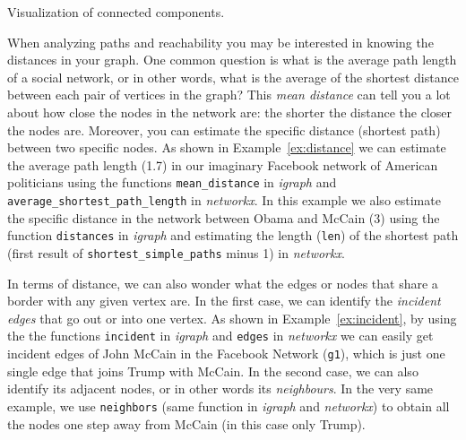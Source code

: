 \begin{ccsexample}
  \caption{Visualization of connected components.}
  \label{ex:component}
\end{ccsexample}

When analyzing paths and reachability you may be interested in knowing the distances in your graph. One common question is what is the average path length of a social network, or in other words, what is the average of the shortest distance between each pair of vertices in the graph? This \emph{mean distance} can tell you a lot about how close the nodes in the network are: the shorter the distance the closer the nodes are. Moreover, you can estimate the specific distance (shortest path) between two specific nodes.  As shown in Example~\ref{ex:distance} we can estimate the average path length (1.7) in our imaginary Facebook network of American politicians using the functions \texttt{mean\_distance} in \emph{igraph} and \texttt{average\_shortest\_path\_length} in \emph{networkx}. In this example we also estimate the specific distance in the network between Obama and McCain (3) using the function \texttt{distances} in \emph{igraph} and estimating the length (\texttt{len}) of the shortest path (first result of \texttt{shortest\_simple\_paths} minus 1) in \emph{networkx}.


In terms of distance, we can also wonder what  the edges or nodes that share a border with any given vertex are. In the first case, we can identify the \emph{incident edges} that go out or into one vertex. As shown in Example~\ref{ex:incident}, by using the the functions \texttt{incident} in \emph{igraph} and \texttt{edges} in \emph{networkx} we can easily get incident edges of John McCain in the Facebook Network (\texttt{g1}), which is just one single edge that joins Trump with McCain. In the second case, we can also identify its adjacent nodes, or in other words its \emph{neighbours}. In the very same example, we use \texttt{neighbors} (same function in \emph{igraph} and \emph{networkx}) to obtain all the nodes one step away from McCain (in this case only Trump).

